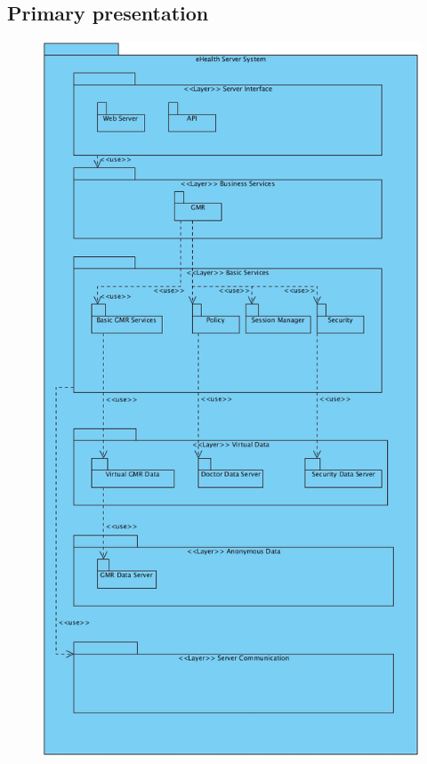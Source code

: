 \documentclass[a4paper,10pt]{article}
\begin{document}
\subsection{Primary presentation}
\begin{center}
\begin{figure}[h!]
\includegraphics[scale=0.5]{../images/LayeredUses_Server.jpg}
\end{figure}
\end{center}
\end{document}
